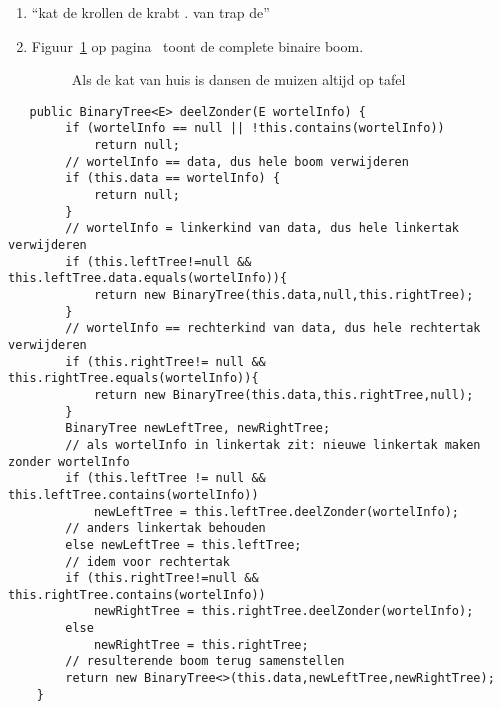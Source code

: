 \begin{Oplossing}{4.19}
\begin{enumerate}
\item “kat de krollen de krabt . van trap de”
\item Figuur~\ref{fig:dansendemuizen} op pagina~\pageref{fig:dansendemuizen} toont de complete binaire boom.
\begin{figure}[htbp]
    \centering
{}
\caption{Als de kat van huis is dansen de muizen altijd op tafel}
    \label{fig:dansendemuizen}
\end{figure}
\end{enumerate}
\end{Oplossing}
\begin{Oplossing}{4.20}
\begin{lstlisting}
   public BinaryTree<E> deelZonder(E wortelInfo) {
        if (wortelInfo == null || !this.contains(wortelInfo))
            return null;
        // wortelInfo == data, dus hele boom verwijderen
        if (this.data == wortelInfo) {
            return null;
        }
        // wortelInfo = linkerkind van data, dus hele linkertak verwijderen
        if (this.leftTree!=null && this.leftTree.data.equals(wortelInfo)){
            return new BinaryTree(this.data,null,this.rightTree);
        }
        // wortelInfo == rechterkind van data, dus hele rechtertak verwijderen
        if (this.rightTree!= null && this.rightTree.equals(wortelInfo)){
            return new BinaryTree(this.data,this.rightTree,null);
        }
        BinaryTree newLeftTree, newRightTree;
        // als wortelInfo in linkertak zit: nieuwe linkertak maken zonder wortelInfo
        if (this.leftTree != null && this.leftTree.contains(wortelInfo))
            newLeftTree = this.leftTree.deelZonder(wortelInfo);
        // anders linkertak behouden
        else newLeftTree = this.leftTree;
        // idem voor rechtertak
        if (this.rightTree!=null && this.rightTree.contains(wortelInfo))
            newRightTree = this.rightTree.deelZonder(wortelInfo);
        else
            newRightTree = this.rightTree;
        // resulterende boom terug samenstellen
        return new BinaryTree<>(this.data,newLeftTree,newRightTree);
    }
\end{lstlisting}
\end{Oplossing}
